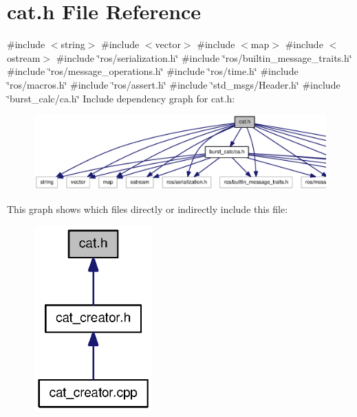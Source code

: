 \section{cat.\-h \-File \-Reference}
\label{cat_8h}
{\ttfamily \#include $<$string$>$}\*
{\ttfamily \#include $<$vector$>$}\*
{\ttfamily \#include $<$map$>$}\*
{\ttfamily \#include $<$ostream$>$}\*
{\ttfamily \#include \char`\"{}ros/serialization.\-h\char`\"{}}\*
{\ttfamily \#include \char`\"{}ros/builtin\-\_\-message\-\_\-traits.\-h\char`\"{}}\*
{\ttfamily \#include \char`\"{}ros/message\-\_\-operations.\-h\char`\"{}}\*
{\ttfamily \#include \char`\"{}ros/time.\-h\char`\"{}}\*
{\ttfamily \#include \char`\"{}ros/macros.\-h\char`\"{}}\*
{\ttfamily \#include \char`\"{}ros/assert.\-h\char`\"{}}\*
{\ttfamily \#include \char`\"{}std\-\_\-msgs/\-Header.\-h\char`\"{}}\*
{\ttfamily \#include \char`\"{}burst\-\_\-calc/ca.\-h\char`\"{}}\*
\-Include dependency graph for cat.\-h\-:\nopagebreak
\begin{figure}[H]
\begin{center}
\leavevmode
\includegraphics[width=350pt]{cat_8h__incl}
\end{center}
\end{figure}
\-This graph shows which files directly or indirectly include this file\-:\nopagebreak
\begin{figure}[H]
\begin{center}
\leavevmode
\includegraphics[width=128pt]{cat_8h__dep__incl}
\end{center}
\end{figure}
